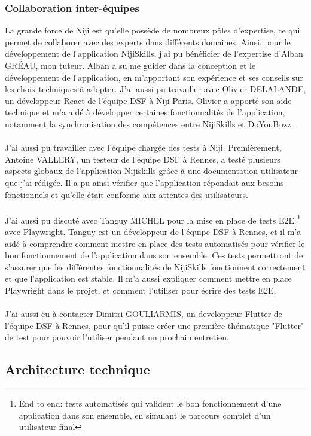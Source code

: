 \documentclass[12pt]{article}
\begin{document}
\subsubsection{Collaboration inter-équipes}
La grande force de Niji est qu'elle possède de nombreux pôles d'expertise, ce qui permet de collaborer avec des experts dans différents domaines. Ainsi, pour le développement de l'application NijiSkills, j'ai pu bénéficier de l'expertise d'Alban GRÉAU, mon tuteur. Alban a su me guider dans la conception et le développement de l'application, en m'apportant son expérience et ses conseils sur les choix techniques à adopter. J'ai aussi pu travailler avec Olivier DELALANDE, un développeur React de l'équipe DSF à Niji Paris. Olivier a apporté son aide technique et m'a aidé à développer certaines fonctionnalités de l'application, notamment la synchronisation des compétences entre NijiSkills et DoYouBuzz.
\\\\
J'ai aussi pu travailler avec l'équipe chargée des tests à Niji. Premièrement, Antoine VALLERY, un testeur de l'équipe DSF à Rennes, a testé plusieurs aspects globaux de l'application Nijiskills grâce à une documentation utilisateur que j'ai rédigée. Il a pu ainsi vérifier que l'application répondait aux besoins fonctionnels et qu'elle était conforme aux attentes des utilisateurs. 
\\\\
J'ai aussi pu discuté avec Tanguy MICHEL pour la mise en place de tests E2E \footnote{End to end:  tests automatisés qui valident le bon fonctionnement d’une application dans son ensemble, en simulant le parcours complet d’un utilisateur final } avec Playwright. Tanguy est un développeur de l'équipe DSF à Rennes, et il m'a aidé à comprendre comment mettre en place des tests automatisés pour vérifier le bon fonctionnement de l'application dans son ensemble. Ces tests permettront de s'assurer que les différentes fonctionnalités de NijiSkills fonctionnent correctement et que l'application est stable. Il m'a aussi expliquer comment mettre en place Playwright dans le projet, et comment l'utiliser pour écrire des tests E2E.
\\\\
J'ai aussi eu à contacter Dimitri GOULIARMIS, un developpeur Flutter de l'équipe DSF à Rennes, pour qu'il puisse créer une première thématique "Flutter" de test pour pouvoir l'utiliser pendant un prochain entretien.

\subsection{Architecture technique}
\end{document}
